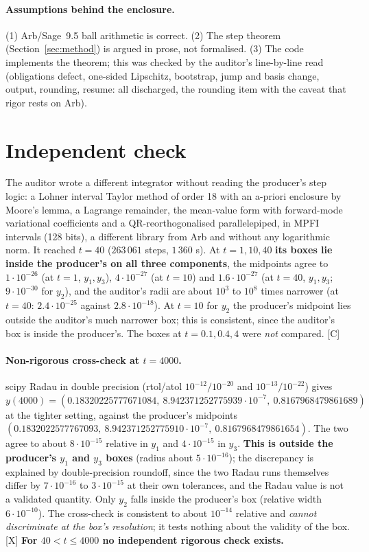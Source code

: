 \documentclass[11pt]{article}
\newcommand{\tier}[1]{\textsf{[#1]}}
\newcommand{\tC}{\tier{C}}
\newcommand{\tX}{\tier{X}}
\theoremstyle{remark}
\begin{document}
\paragraph{Assumptions behind the enclosure.} (1) Arb/Sage~9.5 ball arithmetic is correct. (2) The step theorem (Section~\ref{sec:method}) is argued in prose, not formalised. (3) The code implements the theorem; this was checked by the auditor's line-by-line read (obligations defect, one-sided Lipschitz, bootstrap, jump and basis change, output, rounding, resume: all discharged, the rounding item with the caveat that rigor rests on Arb).

\section{Independent check}\label{sec:indep}
The auditor wrote a different integrator without reading the producer's step logic: a Lohner interval Taylor method of order 18 with an a-priori enclosure by Moore's lemma, a Lagrange remainder, the mean-value form with forward-mode variational coefficients and a QR-reorthogonalised parallelepiped, in MPFI intervals (128 bits), a different library from Arb and without any logarithmic norm. It reached $t=40$ ($263\,061$ steps, $1\,360$ s). At $t=1,10,40$ \textbf{its boxes lie inside the producer's on all three components}, the midpoints agree to $1\cdot10^{-26}$ (at $t=1$, $y_1,y_3$), $4\cdot10^{-27}$ (at $t=10$) and $1.6\cdot10^{-27}$ (at $t=40$, $y_1,y_3$; $9\cdot10^{-30}$ for $y_2$), and the auditor's radii are about $10^{3}$ to $10^{8}$ times narrower (at $t=40$: $2.4\cdot10^{-25}$ against $2.8\cdot10^{-18}$). At $t=10$ for $y_2$ the producer's midpoint lies outside the auditor's much narrower box; this is consistent, since the auditor's box is inside the producer's. The boxes at $t=0.1,0.4,4$ were \emph{not} compared. \tC{}

\paragraph{Non-rigorous cross-check at $t=4000$.} scipy Radau in double precision (rtol/atol $10^{-12}/10^{-20}$ and $10^{-13}/10^{-22}$) gives $y(4000)=(0.18320225777671084,\ 8.942371252775939\cdot10^{-7},\ 0.8167968479861689)$ at the tighter setting, against the producer's midpoints $(0.1832022577767093,\ 8.942371252775910\cdot10^{-7},\ 0.8167968479861654)$. The two agree to about $8\cdot10^{-15}$ relative in $y_1$ and $4\cdot10^{-15}$ in $y_3$. \textbf{This is outside the producer's $y_1$ and $y_3$ boxes} (radius about $5\cdot10^{-16}$); the discrepancy is explained by double-precision roundoff, since the two Radau runs themselves differ by $7\cdot10^{-16}$ to $3\cdot10^{-15}$ at their own tolerances, and the Radau value is not a validated quantity. Only $y_2$ falls inside the producer's box (relative width $6\cdot10^{-10}$). The cross-check is consistent to about $10^{-14}$ relative and \emph{cannot discriminate at the box's resolution}; it tests nothing about the validity of the box. \tX{} \textbf{For $40<t\le4000$ no independent rigorous check exists.}
\end{document}
